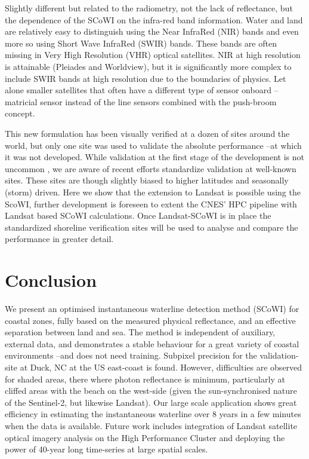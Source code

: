 \documentclass[remotesensing,article,submit,pdftex,moreauthors]{Definitions/mdpi}
\begin{document}
Slightly different but related to the radiometry, not the lack of reflectance, but the dependence of the SCoWI on the infra-red band information. Water and land are relatively easy to distinguish using the Near InfraRed (NIR) bands and even more so using Short Wave InfraRed (SWIR) bands. These bands are often missing in Very High Resolution (VHR) optical satellites. NIR at high resolution is attainable (Pleiades and Worldview), but it is significantly more complex to include SWIR bands at high resolution due to the boundaries of physics. Let alone smaller satellites that often have a different type of sensor onboard --matricial sensor instead of the line sensors combined with the push-broom concept. 

This new formulation has been visually verified at a dozen of sites around the world, but only one site was used to validate the absolute performance --at which it was not developed. While validation at the first stage of the development is not uncommon \citep{VOS2019_google,CASTELLE2021107707}, we are aware of recent efforts standardize validation at well-known sites. These sites are though slightly biased to higher latitudes and seasonally (storm) driven. Here we show that the extension to Landsat is possible using the ScoWI, further development is foreseen to extent the CNES' HPC pipeline with Landsat based SCoWI calculations. Once Landsat-SCoWI is in place the standardized shoreline verification sites will be used to analyse and compare the performance in greater detail. 

\section{Conclusion}
We present an optimised instantaneous waterline detection method (SCoWI) for coastal zones, fully based on the measured physical reflectance, and an effective separation between land and sea. The method is independent of auxiliary, external data, and demonstrates a stable behaviour for a great variety of coastal environments --and does not need training. Subpixel precision for the validation-site at Duck, NC at the US east-coast is found. However, difficulties are observed for shaded areas, there where photon reflectance is minimum, particularly at cliffed areas with the beach on the west-side (given the sun-synchronised nature of the Sentinel-2, but likewise Landsat). Our large scale application shows great efficiency in estimating the instantaneous waterline over 8 years in a few minutes when the data is available. Future work includes integration of Landsat satellite optical imagery analysis on the High Performance Cluster and deploying the power of 40-year long time-series at large spatial scales.
\end{document}
